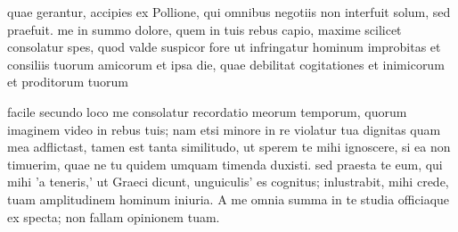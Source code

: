


 quae gerantur, accipies ex Pollione, qui omnibus negotiis non interfuit solum, sed praefuit. me in summo dolore, quem in tuis rebus capio, maxime scilicet consolatur spes, quod valde suspicor fore ut infringatur hominum improbitas et consiliis tuorum amicorum et ipsa die, quae debilitat cogitationes et inimicorum et proditorum tuorum

 facile secundo loco me consolatur recordatio meorum temporum, quorum imaginem video in rebus tuis; nam etsi minore in re violatur tua dignitas quam mea adflictast, tamen est tanta similitudo, ut sperem te mihi ignoscere, si ea non timuerim, quae ne tu quidem umquam timenda duxisti. sed praesta te eum, qui mihi 'a teneris,' ut Graeci dicunt, unguiculis' es cognitus; inlustrabit, mihi crede, tuam amplitudinem hominum iniuria. A me omnia summa in te studia officiaque ex specta; non fallam opinionem tuam.
